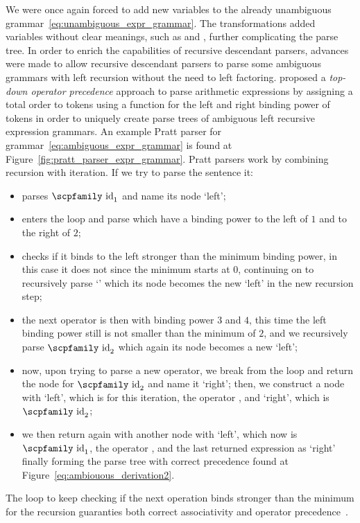 \documentclass[
  oneside,
  english,
  coorientadorbanca,
  noabntexcite
]{ufsc-thesis-rn46-2019}
\newcommand{\codett}[1]{\text{\scpfamily#1}}
\newcommand{\code}[1]{\text{\scpfamily\setlength\spaceskip{0.35em}#1}}
\newcommand{\bnfvar}[1]{\codett{#1}}
\newcommand{\bnfter}[1]{\textrm{`}\codett{#1}\textrm{'}}
\begin{document}
We were once again forced to add new variables to the already unambiguous grammar~\eqref{eq:unambiguous_expr_grammar}.
The transformations added variables without clear meanings, such as \bnfvar{Expr2} and \bnfvar{Term2}, further complicating the parse tree.
In order to enrich the capabilities of recursive descendant parsers, advances were made to allow recursive descendant parsers to parse some ambiguous grammars with left recursion without the need to left factoring.
\textcite{pratt1973operatorprecedence} proposed a \textit{top-down operator precedence} approach to parse arithmetic expressions by assigning a total order to tokens using a function for the left and right binding power of tokens in order to uniquely create parse trees of ambiguous left recursive expression grammars.
An example Pratt parser for grammar~\eqref{eq:ambiguous_expr_grammar} is found at Figure~\ref{fig:pratt_parser_expr_grammar}.
Pratt parsers work by combining recursion with iteration.
If we try to parse the sentence \code{$\code{id}_1$ + number * $\code{id}_2$} it:
\begin{itemize}
  \item parses $\codett{id}_1$ and name its node `left';
  \item enters the loop and parse \codett{+} which have a binding power to the left of $1$ and to the right of $2$;
  \item checks if it binds to the left stronger than the minimum binding power, in this case it does not since the minimum starts at $0$, continuing on to recursively parse \bnfter{number} which its node becomes the new `left' in the new recursion step;
  \item the next operator is then \codett{*} with binding power $3$ and $4$, this time the left binding power still is not smaller than the minimum of $2$, and we recursively parse $\codett{id}_2$ which again its node becomes a new `left';
  \item now, upon trying to parse a new operator, we break from the loop and return the node for $\codett{id}_2$ and name it `right'; then, we construct a node \bnfvar{Expr} with `left', which is \codett{number} for this iteration, the operator \codett{*}, and `right', which is $\codett{id}_2$;
  \item we then return again with another \bnfvar{Expr} node with `left', which now is $\codett{id}_1$, the operator \codett{+}, and the last returned expression as `right' finally forming the parse tree with correct precedence found at Figure~\ref{eq:ambiouous_derivation2}.
\end{itemize}
The loop to keep checking if the next operation binds stronger than the minimum for the recursion guaranties both correct associativity and operator precedence~\cite{pratt1973operatorprecedence}.
\end{document}
